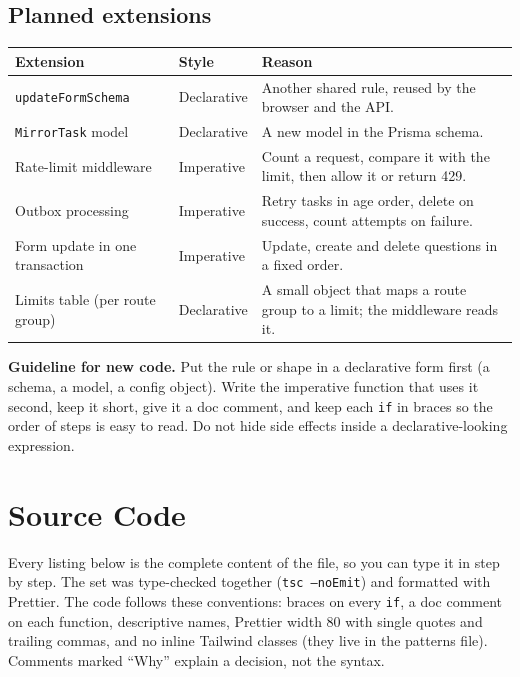 \documentclass[11pt,a4paper]{article}
\begin{document}
\subsection{Planned extensions}
\begin{center}
\begin{tabular}{@{}p{4.2cm}p{4.0cm}p{6.4cm}@{}}
\toprule
\textbf{Extension} & \textbf{Style} & \textbf{Reason}\\
\midrule
\texttt{updateFormSchema} & Declarative & Another shared rule, reused by the browser and the API.\\
\texttt{MirrorTask} model & Declarative & A new model in the Prisma schema.\\
Rate-limit middleware & Imperative & Count a request, compare it with the limit, then allow it or return 429.\\
Outbox processing & Imperative & Retry tasks in age order, delete on success, count attempts on failure.\\
Form update in one transaction & Imperative & Update, create and delete questions in a fixed order.\\
Limits table (per route group) & Declarative & A small object that maps a route group to a limit; the middleware reads it.\\
\bottomrule
\end{tabular}
\end{center}

\textbf{Guideline for new code.} Put the rule or shape in a declarative form first (a schema, a model, a config object). Write the imperative function that uses it second, keep it short, give it a doc comment, and keep each \texttt{if} in braces so the order of steps is easy to read. Do not hide side effects inside a declarative-looking expression.

\newpage
\section{Source Code}\label{sec:code}
Every listing below is the complete content of the file, so you can type it in step by step. The set was type-checked together (\texttt{tsc --noEmit}) and formatted with Prettier. The code follows these conventions: braces on every \texttt{if}, a doc comment on each function, descriptive names, Prettier width 80 with single quotes and trailing commas, and no inline Tailwind classes (they live in the patterns file). Comments marked ``Why'' explain a decision, not the syntax.
\end{document}
